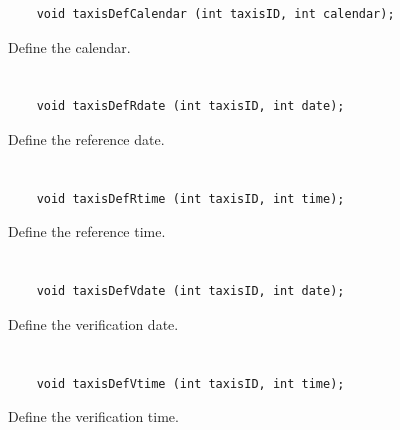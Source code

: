\begin{verbatim}
    void taxisDefCalendar (int taxisID, int calendar);
\end{verbatim}

Define the calendar.


\section*{\tt {}}

\begin{verbatim}
    void taxisDefRdate (int taxisID, int date);
\end{verbatim}

Define the reference date.


\section*{\tt {}}

\begin{verbatim}
    void taxisDefRtime (int taxisID, int time);
\end{verbatim}

Define the reference time.


\section*{\tt {}}

\begin{verbatim}
    void taxisDefVdate (int taxisID, int date);
\end{verbatim}

Define the verification date.


\section*{\tt {}}

\begin{verbatim}
    void taxisDefVtime (int taxisID, int time);
\end{verbatim}

Define the verification time.


\section*{\tt {}}

